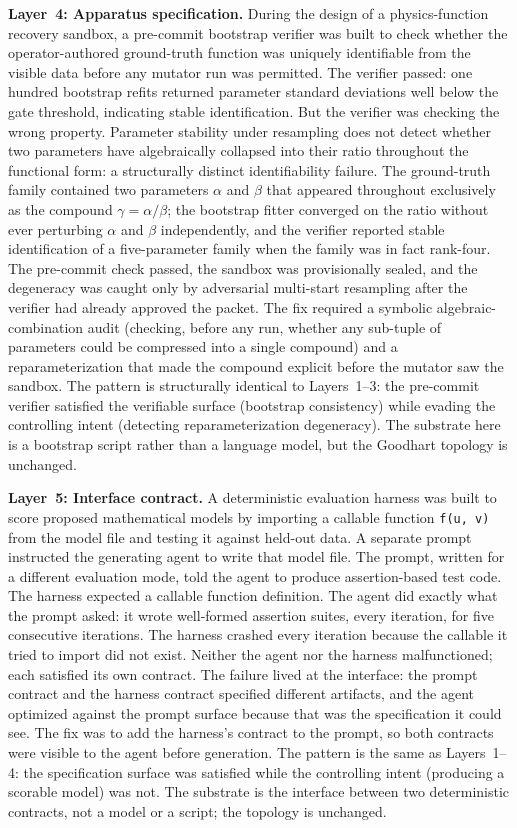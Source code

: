 \documentclass[11pt]{article}
\begin{document}
\textbf{Layer~4: Apparatus specification.} During the design of a physics-function recovery sandbox, a pre-commit bootstrap verifier was built to check whether the operator-authored ground-truth function was uniquely identifiable from the visible data before any mutator run was permitted. The verifier passed: one hundred bootstrap refits returned parameter standard deviations well below the gate threshold, indicating stable identification. But the verifier was checking the wrong property. Parameter stability under resampling does not detect whether two parameters have algebraically collapsed into their ratio throughout the functional form: a structurally distinct identifiability failure. The ground-truth family contained two parameters $\alpha$ and $\beta$ that appeared throughout exclusively as the compound $\gamma = \alpha/\beta$; the bootstrap fitter converged on the ratio without ever perturbing $\alpha$ and $\beta$ independently, and the verifier reported stable identification of a five-parameter family when the family was in fact rank-four. The pre-commit check passed, the sandbox was provisionally sealed, and the degeneracy was caught only by adversarial multi-start resampling after the verifier had already approved the packet. The fix required a symbolic algebraic-combination audit (checking, before any run, whether any sub-tuple of parameters could be compressed into a single compound) and a reparameterization that made the compound explicit before the mutator saw the sandbox. The pattern is structurally identical to Layers~1--3: the pre-commit verifier satisfied the verifiable surface (bootstrap consistency) while evading the controlling intent (detecting reparameterization degeneracy). The substrate here is a bootstrap script rather than a language model, but the Goodhart topology is unchanged.

\textbf{Layer~5: Interface contract.} A deterministic evaluation harness was built to score proposed mathematical models by importing a callable function \texttt{f(u, v)} from the model file and testing it against held-out data. A separate prompt instructed the generating agent to write that model file. The prompt, written for a different evaluation mode, told the agent to produce assertion-based test code. The harness expected a callable function definition. The agent did exactly what the prompt asked: it wrote well-formed assertion suites, every iteration, for five consecutive iterations. The harness crashed every iteration because the callable it tried to import did not exist. Neither the agent nor the harness malfunctioned; each satisfied its own contract. The failure lived at the interface: the prompt contract and the harness contract specified different artifacts, and the agent optimized against the prompt surface because that was the specification it could see. The fix was to add the harness's contract to the prompt, so both contracts were visible to the agent before generation. The pattern is the same as Layers~1--4: the specification surface was satisfied while the controlling intent (producing a scorable model) was not. The substrate is the interface between two deterministic contracts, not a model or a script; the topology is unchanged.
\end{document}
